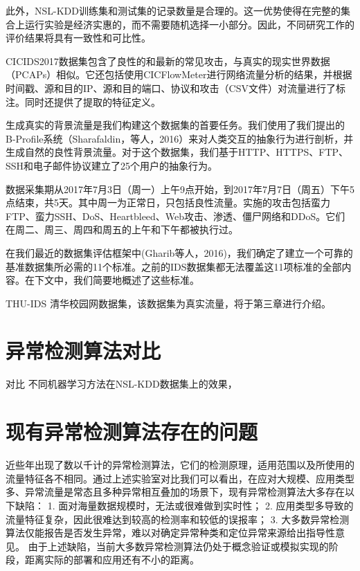 此外，NSL-KDD训练集和测试集的记录数量是合理的。这一优势使得在完整的集合上运行实验是经济实惠的，而不需要随机选择一小部分。因此，不同研究工作的评价结果将具有一致性和可比性。

CICIDS2017数据集包含了良性的和最新的常见攻击，与真实的现实世界数据（PCAPs）相似。它还包括使用CICFlowMeter进行网络流量分析的结果，并根据时间戳、源和目的IP、源和目的端口、协议和攻击（CSV文件）对流量进行了标注。同时还提供了提取的特征定义。

生成真实的背景流量是我们构建这个数据集的首要任务。我们使用了我们提出的B-Profile系统（Sharafaldin，等人，2016）来对人类交互的抽象行为进行剖析，并生成自然的良性背景流量。对于这个数据集，我们基于HTTP、HTTPS、FTP、SSH和电子邮件协议建立了25个用户的抽象行为。

数据采集期从2017年7月3日（周一）上午9点开始，到2017年7月7日（周五）下午5点结束，共5天。其中周一为正常日，只包括良性流量。实施的攻击包括蛮力FTP、蛮力SSH、DoS、Heartbleed、Web攻击、渗透、僵尸网络和DDoS。它们在周二、周三、周四和周五的上午和下午都被执行过。

在我们最近的数据集评估框架中(Gharib等人，2016)，我们确定了建立一个可靠的基准数据集所必需的11个标准。之前的IDS数据集都无法覆盖这11项标准的全部内容。在下文中，我们简要地概述了这些标准。

THU-IDS 清华校园网数据集，该数据集为真实流量，将于第三章进行介绍。

\section{异常检测算法对比}
对比
不同机器学习方法在NSL-KDD数据集上的效果，
\section{现有异常检测算法存在的问题}
近些年出现了数以千计的异常检测算法，它们的检测原理，适用范围以及所使用的流量特征各不相同。通过上述实验室对比我们可以看出，在应对大规模、应用类型多、异常流量是常态且多种异常相互叠加的场景下，现有异常检测算法大多存在以下缺陷：
1.	面对海量数据规模时，无法或很难做到实时性；
2.	应用类型多导致的流量特征复杂，因此很难达到较高的检测率和较低的误报率；
3.	大多数异常检测算法仅能报告是否发生异常，难以对确定异常种类和定位异常来源给出指导性意见。
由于上述缺陷，当前大多数异常检测算法仍处于概念验证或模拟实现的阶段，距离实际的部署和应用还有不小的距离。
